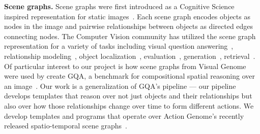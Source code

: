 

\noindent\textbf{Scene graphs.}
Scene graphs were first introduced as a Cognitive Science~\cite{biederman1982scene,wolfe1998visual} inspired representation for static images~\cite{krishna2017visual}. Each scene graph encodes objects as nodes in the image and pairwise relationships between objects as directed edges connecting nodes. 
The Computer Vision community has utilized the scene graph representation for a variety of tasks including visual question answering~\cite{johnson2017inferring}, relationship modeling~\cite{lu2016visual}, object localization~\cite{krishna2018referring}, evaluation~\cite{anderson2016spice}, generation~\cite{johnson2018image,ashual2019specifying}, retrieval~\cite{ashual2019specifying,johnson2015image}. Of particular interest to our project is how scene graphs from Visual Genome~\cite{krishna2017visual} were used by create GQA, a benchmark for compositional spatial reasoning over an image~\cite{hudson2019gqa}. Our work is a generalization of GQA's pipeline --- our pipeline develops templates that reason over not just objects and their relationships but also over how those relationships change over time to form different actions. We develop templates and programs that operate over Action Genome's recently released spatio-temporal scene graphs~\cite{ji2020action}.

